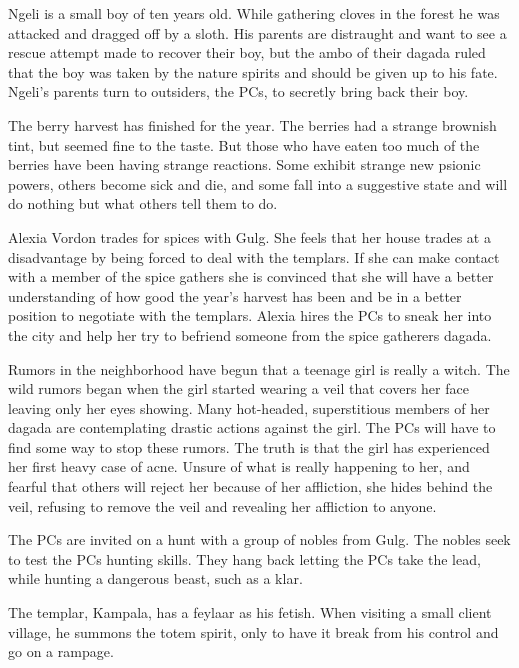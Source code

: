 {
	\item Ngeli is a small boy of ten years old. While gathering cloves in the forest he was attacked and dragged off by a sloth. His parents are distraught and want to see a rescue attempt made to recover their boy, but the ambo of their dagada ruled that the boy was taken by the nature spirits and should be given up to his fate. Ngeli's parents turn to outsiders, the PCs, to secretly bring back their boy.
	\item The berry harvest has finished for the year. The berries had a strange brownish tint, but seemed fine to the taste. But those who have eaten too much of the berries have been having strange reactions. Some exhibit strange new psionic powers, others become sick and die, and some fall into a suggestive state and will do nothing but what others tell them to do.
	\item Alexia Vordon trades for spices with Gulg. She feels that her house trades at a disadvantage by being forced to deal with the templars. If she can make contact with a member of the spice gathers she is convinced that she will have a better understanding of how good the year's harvest has been and be in a better position to negotiate with the templars. Alexia hires the PCs to sneak her into the city and help her try to befriend someone from the spice gatherers dagada.
	\item Rumors in the neighborhood have begun that a teenage girl is really a witch. The wild rumors began when the girl started wearing a veil that covers her face leaving only her eyes showing. Many hot-headed, superstitious members of her dagada are contemplating drastic actions against the girl. The PCs will have to find some way to stop these rumors. The truth is that the girl has experienced her first heavy case of acne. Unsure of what is really happening to her, and fearful that others will reject her because of her affliction, she hides behind the veil, refusing to remove the veil and revealing her affliction to anyone.
	\item The PCs are invited on a hunt with a group of nobles from Gulg. The nobles seek to test the PCs hunting skills. They hang back letting the PCs take the lead, while hunting a dangerous beast, such as a klar.
	\item The templar, Kampala, has a feylaar as his fetish. When visiting a small client village, he summons the totem spirit, only to have it break from his control and go on a rampage.
}
